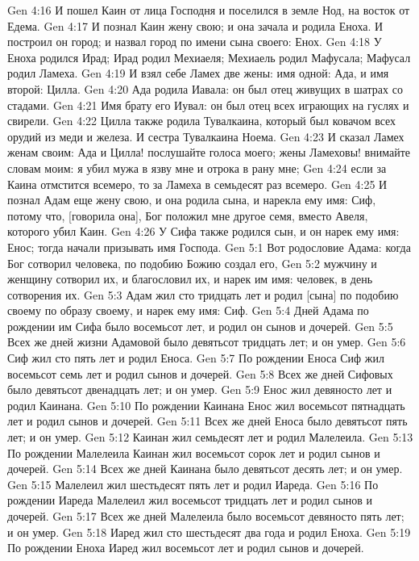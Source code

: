 Gen 4:16  И пошел Каин от лица Господня и поселился в земле Нод, на восток от Едема.
Gen 4:17  И познал Каин жену свою; и она зачала и родила Еноха. И построил он город; и назвал город по имени сына своего: Енох.
Gen 4:18  У Еноха родился Ирад; Ирад родил Мехиаеля; Мехиаель родил Мафусала; Мафусал родил Ламеха.
Gen 4:19  И взял себе Ламех две жены: имя одной: Ада, и имя второй: Цилла.
Gen 4:20  Ада родила Иавала: он был отец живущих в шатрах со стадами.
Gen 4:21  Имя брату его Иувал: он был отец всех играющих на гуслях и свирели.
Gen 4:22  Цилла также родила Тувалкаина, который был ковачом всех орудий из меди и железа. И сестра Тувалкаина Ноема.
Gen 4:23  И сказал Ламех женам своим: Ада и Цилла! послушайте голоса моего; жены Ламеховы! внимайте словам моим: я убил мужа в язву мне и отрока в рану мне;
Gen 4:24  если за Каина отмстится всемеро, то за Ламеха в семьдесят раз всемеро.
Gen 4:25  И познал Адам еще жену свою, и она родила сына, и нарекла ему имя: Сиф, потому что, [говорила она], Бог положил мне другое семя, вместо Авеля, которого убил Каин.
Gen 4:26  У Сифа также родился сын, и он нарек ему имя: Енос; тогда начали призывать имя Господа.
Gen 5:1  Вот родословие Адама: когда Бог сотворил человека, по подобию Божию создал его,
Gen 5:2  мужчину и женщину сотворил их, и благословил их, и нарек им имя: человек, в день сотворения их.
Gen 5:3  Адам жил сто тридцать лет и родил [сына] по подобию своему по образу своему, и нарек ему имя: Сиф.
Gen 5:4  Дней Адама по рождении им Сифа было восемьсот лет, и родил он сынов и дочерей.
Gen 5:5  Всех же дней жизни Адамовой было девятьсот тридцать лет; и он умер.
Gen 5:6  Сиф жил сто пять лет и родил Еноса.
Gen 5:7  По рождении Еноса Сиф жил восемьсот семь лет и родил сынов и дочерей.
Gen 5:8  Всех же дней Сифовых было девятьсот двенадцать лет; и он умер.
Gen 5:9  Енос жил девяносто лет и родил Каинана.
Gen 5:10  По рождении Каинана Енос жил восемьсот пятнадцать лет и родил сынов и дочерей.
Gen 5:11  Всех же дней Еноса было девятьсот пять лет; и он умер.
Gen 5:12  Каинан жил семьдесят лет и родил Малелеила.
Gen 5:13  По рождении Малелеила Каинан жил восемьсот сорок лет и родил сынов и дочерей.
Gen 5:14  Всех же дней Каинана было девятьсот десять лет; и он умер.
Gen 5:15  Малелеил жил шестьдесят пять лет и родил Иареда.
Gen 5:16  По рождении Иареда Малелеил жил восемьсот тридцать лет и родил сынов и дочерей.
Gen 5:17  Всех же дней Малелеила было восемьсот девяносто пять лет; и он умер.
Gen 5:18  Иаред жил сто шестьдесят два года и родил Еноха.
Gen 5:19  По рождении Еноха Иаред жил восемьсот лет и родил сынов и дочерей.
